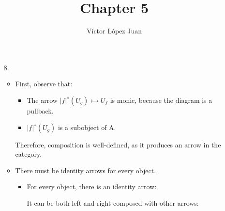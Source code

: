 \documentclass{article}
\author{Víctor López Juan}
\title{Chapter 5}
\begin{document}
\begin{enumerate}

  \item[8.]

    \begin{itemize}
      \item

        
        First, observe that:
        
      \begin{itemize}
        \item The arrow $\vert f \vert^\star (U_g) \rightarrowtail U_f$
          is monic, because the diagram is a pullback.

        \item $\vert f \vert ^\star (U_g)$ is a subobject of A.

      \end{itemize}

        Therefore, composition is well-defined, as it produces an arrow
        in the category.

      \item There must be identity arrows for every object.

        \begin{itemize}
          \item For every object, there is an identity arrow:

    
            It can be both left and right composed with other arrows:

            \begin{multicols}{2}
              



\end{multicols}
\end{itemize}
\end{itemize}
\end{enumerate}
\end{document}
